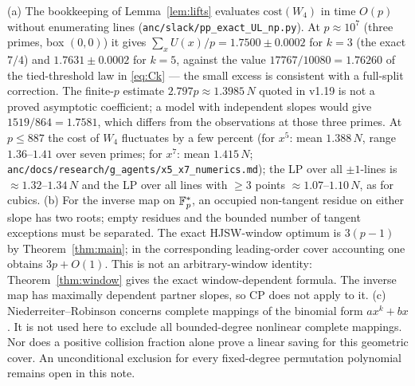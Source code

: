 \begin{remark}
(a) The bookkeeping of Lemma~\ref{lem:lifts} evaluates $\mathrm{cost}(W_4)$ in time $O(p)$ without enumerating lines
(\texttt{anc/slack/pp\_exact\_UL\_np.py}).  At $p\approx10^7$ (three primes, box $(0,0)$) it gives $\sum_xU(x)/p=1.7500\pm0.0002$ for $k=3$ (the exact $7/4$) and
$1.7631\pm0.0002$ for $k=5$, against the value $17767/10080=1.76260$ of the tied-threshold law in \eqref{eq:Ck} — the small excess is consistent with a full-split correction.  The finite-$p$ estimate $2.797p\approx1.3985\,N$ quoted in v1.19 is not a proved asymptotic coefficient; a model with independent slopes would give
$1519/864=1.7581$, which differs from the observations at those three primes.  At $p\le887$ the cost of $W_4$ fluctuates by a few percent (for $x^5$: mean $1.388\,N$, range $1.36$--$1.41$
over seven primes; for $x^7$: mean $1.415\,N$; \texttt{anc/docs/research/g\_agents/x5\_x7\_numerics.md}); the LP over all $\pm1$-lines is $\approx1.32$--$1.34\,N$
and the LP over all lines with $\ge3$ points $\approx1.07$--$1.10\,N$, as for cubics.
(b) For the inverse map on $\mathbb{F}_p^*$, an occupied non-tangent residue on either slope has two roots; empty residues and the bounded number of tangent exceptions must be separated.
The exact HJSW-window optimum is $3(p-1)$ by Theorem~\ref{thm:main}; in the corresponding leading-order cover accounting one obtains $3p+O(1)$.
This is not an arbitrary-window identity: Theorem~\ref{thm:window} gives the exact window-dependent formula.
The inverse map has maximally dependent partner slopes, so CP does not apply to it.
(c) Niederreiter--Robinson \cite[Theorem 9 and Corollary 2]{NR82} concerns complete mappings of the binomial form $ax^k+bx$.
It is not used here to exclude all bounded-degree nonlinear complete mappings.
Nor does a positive collision fraction alone prove a linear saving for this geometric cover.
An unconditional exclusion for every fixed-degree permutation polynomial remains open in this note.
\end{remark}
